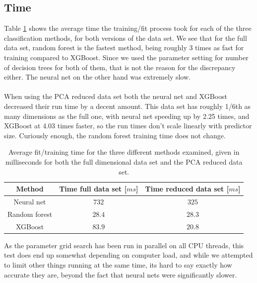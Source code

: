 \documentclass[a4paper]{article}
\newcommand\red[1]{\textcolor{red}{\textbf{#1}}}
\begin{document}
\subsection{Time}
Table \ref{tab:timing} shows the average time the training/fit process took for each of the three classification methods, for both versions of the data set. We see that for the full data set, random forest is the fastest method, being roughly 3 times as fast for training compared to XGBoost. Since we used the parameter setting for number of decision trees for both of them, that is not the reason for the discrepancy either. The neural net on the other hand was extremely slow.
\\\\
When using the PCA reduced data set both the neural net and XGBoost decreased their run time by a decent amount. This data set has roughly 1/6th as many dimensions as the full one, with neural net speeding up by 2.25 times, and XGBoost at 4.03 times faster, so the run times don't scale linearly with predictor size. Curiously enough, the random forest training time does not change.

\begin{table}[H]
  \centering
  \caption{Average fit/training time for the three different methods examined, given in milliseconds for both the full dimensional data set and the PCA reduced data set.}
  \label{tab:timing}
  \begin{tabular}{c|c|c}
    \hline\hline
    Method & Time full data set [$ms$] & Time reduced data set [$ms$] \\\hline
    Neural net & $732$ & $325$ \\
    Random forest & $28.4$ & $28.3$ \\
    XGBoost & $83.9$ & $20.8$
    \end{tabular}
\end{table}
As the parameter grid search has been run in parallel on all CPU threads, this test does end up somewhat depending on computer load, and while we attempted to limit other things running at the same time, its hard to say exactly how accurate they are, beyond the fact that neural nets were significantly slower.
\end{document}

